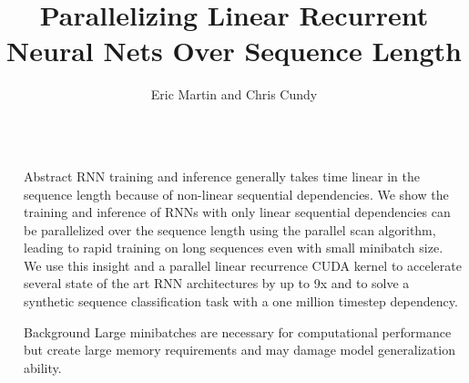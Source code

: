 \documentclass[final]{beamer}
\title{Parallelizing Linear Recurrent Neural Nets Over Sequence Length} %
\author{Eric Martin and Chris Cundy} %
\institute{Fill in institutes} %
\newlength{\sepwid}
\newlength{\onecolwid}
\begin{document}

\setlength{\belowcaptionskip}{2ex} %
\setlength\belowdisplayshortskip{2ex} %

\begin{frame}[t] %

\begin{columns}[t] %

\begin{column}{\sepwid}\end{column} %

\begin{column}{\onecolwid} %


\begin{alertblock}{Abstract}
RNN training and inference generally takes time linear in the sequence length because
of non-linear sequential dependencies.
We show the training and inference of RNNs with only linear
sequential dependencies can be parallelized over the sequence length using the
parallel scan algorithm, leading to rapid training on long sequences even with
small minibatch size. We use this insight and a parallel linear recurrence CUDA
kernel to accelerate several state of the art RNN architectures by up to 9x and
to solve a synthetic sequence classification task with a one million timestep
dependency.
\end{alertblock}

\begin{block}{Background}
Large minibatches are necessary for computational performance but create large memory
requirements and may damage model generalization ability.


\end{block}
\end{column}
\end{columns}
\end{frame}
\end{document}
